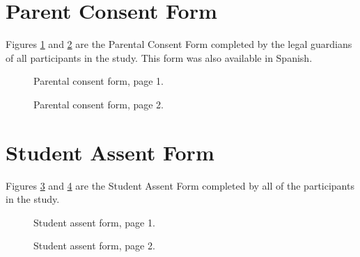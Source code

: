 \section{Parent Consent Form}  \label{sec:parent_consent}
	Figures \ref{fig:consent1} and \ref{fig:consent2} are the Parental Consent Form completed by the legal guardians of all participants in the study. This form was also available in Spanish.
	

	
	\begin{figure}%
   	\centering
   	\caption{Parental consent form, page 1.}
   	\label{fig:consent1}
	\end{figure}

	\begin{figure}%
   	\centering
   	\caption{Parental consent form, page 2.}
   	\label{fig:consent2}
	\end{figure}

\section{Student Assent Form} \label{sec:student_assent}
	
	Figures \ref{fig:assent1} and \ref{fig:assent2} are the Student Assent Form completed by all of the participants in the study. 

	
	\begin{figure}%
   	\centering
   	\caption{Student assent form, page 1.}
   	\label{fig:assent1}
	\end{figure}
	
	\begin{figure}%
   	\centering
   	\caption{Student assent form, page 2.}
   	\label{fig:assent2}
	\end{figure}